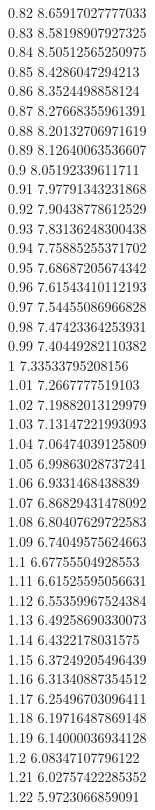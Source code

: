 {0.82	8.65917027777033\\
0.83	8.58198907927325\\
0.84	8.50512565250975\\
0.85	8.4286047294213\\
0.86	8.3524498858124\\
0.87	8.27668355961391\\
0.88	8.20132706971619\\
0.89	8.12640063536607\\
0.9	8.05192339611711\\
0.91	7.97791343231868\\
0.92	7.90438778612529\\
0.93	7.83136248300438\\
0.94	7.75885255371702\\
0.95	7.68687205674342\\
0.96	7.61543410112193\\
0.97	7.54455086966828\\
0.98	7.47423364253931\\
0.99	7.40449282110382\\
1	7.33533795208156\\
1.01	7.2667777519103\\
1.02	7.19882013129979\\
1.03	7.13147221993093\\
1.04	7.06474039125809\\
1.05	6.99863028737241\\
1.06	6.9331468438839\\
1.07	6.86829431478092\\
1.08	6.80407629722583\\
1.09	6.74049575624663\\
1.1	6.67755504928553\\
1.11	6.61525595056631\\
1.12	6.55359967524384\\
1.13	6.49258690330073\\
1.14	6.4322178031575\\
1.15	6.37249205496439\\
1.16	6.31340887354512\\
1.17	6.25496703096411\\
1.18	6.19716487869148\\
1.19	6.14000036934128\\
1.2	6.08347107796122\\
1.21	6.02757422285352\\
1.22	5.9723066859091\\
}
